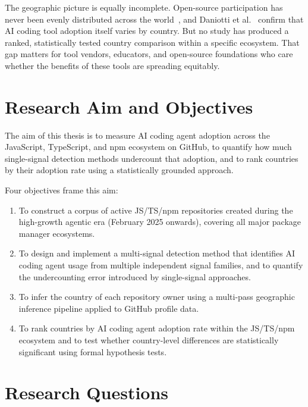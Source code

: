 The geographic picture is equally incomplete. Open-source participation has never been evenly distributed across the world~\cite{wachs2022}, and Daniotti et al.~\cite{daniotti2025} confirm that AI coding tool adoption itself varies by country. But no study has produced a ranked, statistically tested country comparison within a specific ecosystem. That gap matters for tool vendors, educators, and open-source foundations who care whether the benefits of these tools are spreading equitably.

\section{Research Aim and Objectives}
\label{sec:intro:aim}

The aim of this thesis is to measure AI coding agent adoption across the JavaScript, TypeScript, and npm ecosystem on GitHub, to quantify how much single-signal detection methods undercount that adoption, and to rank countries by their adoption rate using a statistically grounded approach.

Four objectives frame this aim:

\begin{enumerate}
  \item To construct a corpus of active JS/TS/npm repositories created during the high-growth agentic era (February 2025 onwards), covering all major package manager ecosystems.

  \item To design and implement a multi-signal detection method that identifies AI coding agent usage from multiple independent signal families, and to quantify the undercounting error introduced by single-signal approaches.

  \item To infer the country of each repository owner using a multi-pass geographic inference pipeline applied to GitHub profile data.

  \item To rank countries by AI coding agent adoption rate within the JS/TS/npm ecosystem and to test whether country-level differences are statistically significant using formal hypothesis tests.
\end{enumerate}

\section{Research Questions}
\label{sec:intro:rqs}


